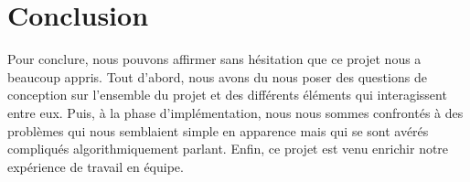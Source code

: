 \chapter*{Conclusion}

Pour conclure, nous pouvons affirmer sans hésitation que ce projet nous a beaucoup appris.
Tout d'abord, nous avons du nous poser des questions de conception sur l'ensemble du projet et des différents éléments qui interagissent entre eux.
Puis, à la phase d'implémentation, nous nous sommes confrontés à des problèmes qui nous semblaient simple en apparence mais qui se sont avérés compliqués algorithmiquement parlant.
Enfin, ce projet est venu enrichir notre expérience de travail en équipe.

